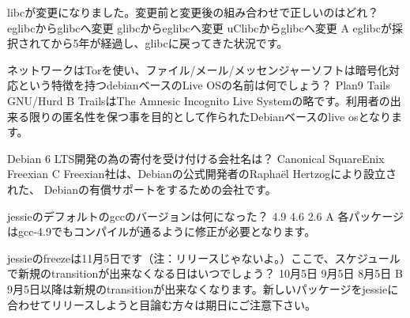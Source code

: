 %

\santaku
{libcが変更になりました。変更前と変更後の組み合わせで正しいのはどれ？}
{eglibcからglibcへ変更}
{glibcからeglibcへ変更}
{uClibcからglibcへ変更}
{A}
{eglibcが採択されてから5年が経過し、glibcに戻ってきた状況です。}

\santaku
{ネットワークはTorを使い、ファイル/メール/メッセンジャーソフトは暗号化対応という特徴を持つdebianベースのLive OSの名前は何でしょう？}
{Plan9}
{Tails}
{GNU/Hurd}
{B}
{TrailsはThe Amnesic Incognito Live Systemの略です。利用者の出来る限りの匿名性を保つ事を目的として作られたDebianベースのlive osとなります。}

\santaku
{Debian 6 LTS開発の為の寄付を受け付ける会社名は？}
{Canonical}
{SquareEnix}
{Freexian}
{C}
{Freexian社は、Debianの公式開発者のRapha\"el Hertzogにより設立された、
Debianの有償サポートをするための会社です。}

\santaku
{jessieのデフォルトのgccのバージョンは何になった？}
{4.9}
{4.6}
{2.6}
{A}
{各パッケージはgcc-4.9でもコンパイルが通るように修正が必要となります。}

\santaku
{jessieのfreezeは11月5日です（注：リリースじゃないよ。）ここで、スケジュールで新規のtransitionが出来なくなる日はいつでしょう？}
{10月5日}
{9月5日}
{8月5日}
{B}
{9月5日以降は新規のtransitionが出来なくなります。新しいパッケージをjessieに合わせてリリースしようと目論む方々は期日にご注意下さい。}
